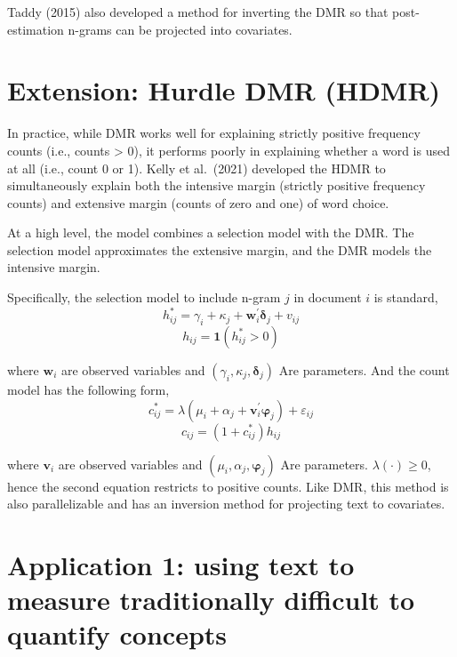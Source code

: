 \documentclass[
]{book}
\begin{document}
Taddy (2015) also developed a method for inverting the DMR so that post-estimation n-grams can be projected into covariates.

\hypertarget{extension-hurdle-dmr-hdmr}{%
\section{Extension: Hurdle DMR (HDMR)}\label{extension-hurdle-dmr-hdmr}}

In practice, while DMR works well for explaining strictly positive frequency counts (i.e., counts \textgreater{} 0), it performs poorly in explaining whether a word is used at all (i.e., count 0 or 1). Kelly et al.~(2021) developed the HDMR to simultaneously explain both the intensive margin (strictly positive frequency counts) and extensive margin (counts of zero and one) of word choice.

At a high level, the model combines a selection model with the DMR. The selection model approximates the extensive margin, and the DMR models the intensive margin.

Specifically, the selection model to include n-gram \(j\) in document \(i\) is standard,
\[
h_{i j}^{*}=\gamma_{i}+\kappa_{j}+\boldsymbol{w}_{i}^{\prime} \boldsymbol{\delta}_{j}+v_{i j}
\]
\[
h_{i j}=\mathbf{1}\left(h_{i j}^{*}>0\right)
\]

where \(\boldsymbol{w}_{i}\) are observed variables and \((\gamma_{i},\kappa_{j},\boldsymbol{\delta}_{j})\) Are parameters. And the count model has the following form,
\[
c_{i j}^{*} =\lambda\left(\mu_{i}+\alpha_{j}+\mathbf{v}_{i}^{\prime} \boldsymbol{\varphi}_{j}\right)+\varepsilon_{i j}
\]
\[
c_{i j} = \left(1+c_{i j}^{*}\right) h_{i j}
\]

where \(\boldsymbol{v}_{i}\) are observed variables and \((\mu_i,\alpha_j,\boldsymbol{\varphi}_{j})\) Are parameters. \(\lambda(\cdot)\geq 0\), hence the second equation restricts to positive counts. Like DMR, this method is also parallelizable and has an inversion method for projecting text to covariates.

\hypertarget{application-1-using-text-to-measure-traditionally-difficult-to-quantify-concepts}{%
\section{Application 1: using text to measure traditionally difficult to quantify concepts}\label{application-1-using-text-to-measure-traditionally-difficult-to-quantify-concepts}}
\end{document}

